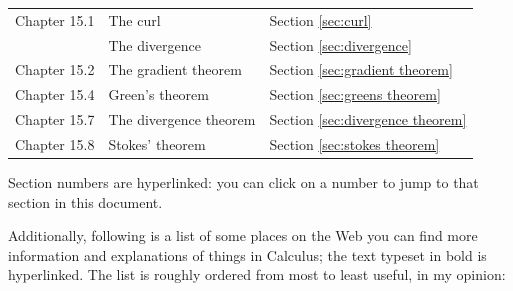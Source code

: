 \documentclass{myarticle}
\theoremstyle{nospace}
\newtheorem{old series theorem}{Theorem}
\newenvironment{series theorem}
{\begin{mdframed}\begin{old series theorem}}
    {\end{old series theorem}\end{mdframed}}
\begin{document}
\begin{longtable}{P{0.2\textwidth}P{0.4\textwidth}P{0.3\textwidth}}
  Chapter 15.1 &
  The curl &
  Section \ref{sec:curl} \\

  &
  The divergence &
  Section \ref{sec:divergence} \\

  Chapter 15.2 &
  The gradient theorem &
  Section \ref{sec:gradient theorem} \\

  Chapter 15.4 &
  Green's theorem &
  Section \ref{sec:greens theorem} \\

  Chapter 15.7 &
  The divergence theorem &
  Section \ref{sec:divergence theorem} \\

  Chapter 15.8 &
  Stokes' theorem &
  Section \ref{sec:stokes theorem} \\

  \bottomrule
\end{longtable}

Section numbers are hyperlinked: you can click on a number to jump to
that section in this document.

Additionally, following is a list of some places on the Web you can
find more information and explanations of things in Calculus; the text
typeset in bold is hyperlinked. The list is roughly ordered from most
to least useful, in my opinion:
\end{document}
